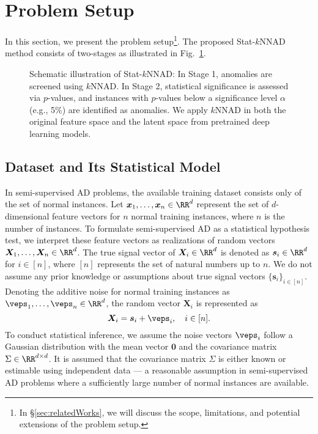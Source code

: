 \section{Problem Setup}
\label{sec:setup}
%
In this section, we present the problem setup\footnote{In \S\ref{sec:relatedWorks}, we will discuss the scope, limitations, and potential extensions of the problem setup.}.
%
The proposed Stat-$k$NNAD method consists of two-stages as illustrated in Fig.~\ref{fig:two-stages}.
%
\begin{figure}[htb]
 \begin{center}
  \caption{Schematic illustration of Stat-$k$NNAD: In Stage 1, anomalies are screened using $k$NNAD. In Stage 2, statistical significance is assessed via $p$-values, and instances with $p$-values below a significance level $\alpha$ (e.g., 5\%) are identified as anomalies. We apply $k$NNAD in both the original feature space and the latent space from pretrained deep learning models.}
  \label{fig:two-stages}
 \end{center}
\end{figure}
%
\subsection{Dataset and Its Statistical Model}
\label{subsec:statistical_model_data}
%
In semi-supervised AD problems, the available training dataset consists only of the set of normal instances.
%
Let $\bm{x}_1, \ldots, \bm{x}_n \in \RR^d$ represent the set of $d$-dimensional feature vectors for $n$ normal training instances, where $n$ is the number of instances.
%
To formulate semi-supervised AD as a statistical hypothesis test, we interpret these feature vectors as realizations of random vectors $\bm{X}_1, \ldots, \bm{X}_n \in \RR^d$.
%
The true signal vector of $\bm{X}_i \in \RR^d$ is denoted as $\bm{s}_i \in \RR^d$ for $i \in [n]$, where $[n]$ represents the set of natural numbers up to $n$.
%
We do not assume any prior knowledge or assumptions about true signal vectors $\{\bm{s}_i\}_{i \in [n]}$.
%
Denoting the additive noise for normal training instances as $\bm \veps_1, \ldots, \bm \veps_n \in \RR^d$, the random vector $\bm X_i$ is represented as
\begin{equation}
 \bm{X}_i = \bm{s}_i + \bm{\veps}_i, \quad i \in [n].
 \label{eq:statistical_model}
\end{equation}
%
To conduct statistical inference, we assume the noise vectors $\bm{\veps}_i$ follow a Gaussian distribution with the mean vector $\bm{0}$ and the covariance matrix $\Sigma \in \RR^{d \times d}$.
%
It is assumed that the covariance matrix $\Sigma$ is either known or estimable using independent data --- a reasonable assumption in semi-supervised AD problems where a sufficiently large number of normal instances are available.

